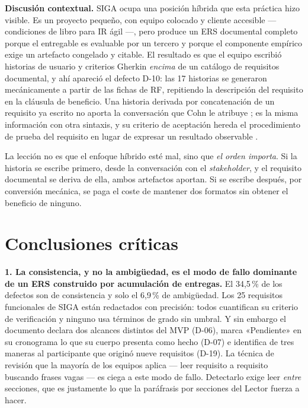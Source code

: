 \documentclass[11pt,letterpaper]{article}
\begin{document}
\textbf{Discusión contextual.} SIGA ocupa una posición híbrida que esta práctica hizo visible. Es un proyecto pequeño, con equipo colocado y cliente accesible --- condiciones de libro para IR ágil ---, pero produce un ERS documental completo porque el entregable es evaluable por un tercero y porque el componente empírico exige un artefacto congelado y citable. El resultado es que el equipo escribió historias de usuario y criterios Gherkin \emph{encima} de un catálogo de requisitos documental, y ahí apareció el defecto D-10: las 17 historias se generaron mecánicamente a partir de las fichas de RF, repitiendo la descripción del requisito en la cláusula de beneficio. Una historia derivada por concatenación de un requisito ya escrito no aporta la conversación que Cohn le atribuye \cite{cohn2004}; es la misma información con otra sintaxis, y su criterio de aceptación hereda el procedimiento de prueba del requisito en lugar de expresar un resultado observable \cite{smart2014}.

La lección no es que el enfoque híbrido esté mal, sino que \emph{el orden importa}. Si la historia se escribe primero, desde la conversación con el \emph{stakeholder}, y el requisito documental se deriva de ella, ambos artefactos aportan. Si se escribe después, por conversión mecánica, se paga el coste de mantener dos formatos sin obtener el beneficio de ninguno.

\section{Conclusiones críticas}

\textbf{1. La consistencia, y no la ambigüedad, es el modo de fallo dominante de un ERS construido por acumulación de entregas.} El 34,5\,\% de los defectos son de consistencia y solo el 6,9\,\% de ambigüedad. Los 25 requisitos funcionales de SIGA están redactados con precisión: todos cuantifican su criterio de verificación y ninguno usa términos de grado sin umbral. Y sin embargo el documento declara dos alcances distintos del MVP (D-06), marca «Pendiente» en su cronograma lo que su cuerpo presenta como hecho (D-07) e identifica de tres maneras al participante que originó nueve requisitos (D-19). La técnica de revisión que la mayoría de los equipos aplica --- leer requisito a requisito buscando frases vagas --- es ciega a este modo de fallo. Detectarlo exige leer \emph{entre} secciones, que es justamente lo que la paráfrasis por secciones del Lector fuerza a hacer.
\end{document}
